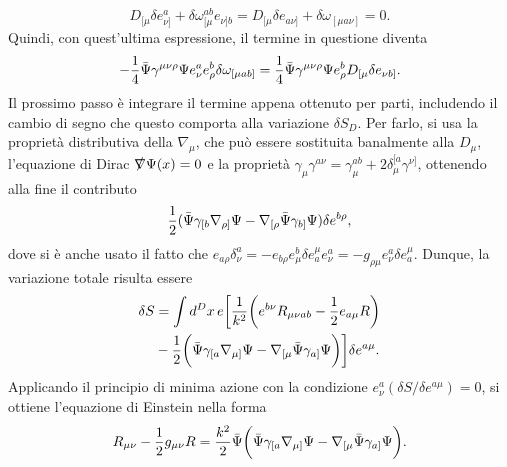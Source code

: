 \begin{equation}
    D_{[\mu}\delta e^a_{\nu]} + \delta\omega^{ab}_{[\mu}e_{\nu]b} = D_{[\mu}\delta e_{a\nu]} + \delta\omega_{[\mu a\nu]} = 0.
\end{equation}
Quindi, con quest'ultima espressione, il termine in questione diventa 
\begin{equation}
    -\frac{1}{4}\b{\Psi}\gamma^{\mu\nu\rho}\Psi e^a_\nu e^b_\rho\delta\omega_{[\mu ab]} = \frac{1}{4}\b{\Psi}\gamma^{\mu\nu\rho}\Psi e^b_\rho D_{[\mu} \delta e_{\nu b]}.
\end{equation}
Il prossimo passo è integrare il termine appena ottenuto per parti, includendo il cambio di segno che questo comporta alla variazione $\delta S_D$. Per farlo, si usa la proprietà distributiva della $\nabla_\mu$, che può essere sostituita banalmente alla $D_\mu$, l'equazione di Dirac $\sl{\nabla}\Psi(x) = 0$ e la proprietà $\gamma_\mu \gamma^{a\nu} = \gamma^{ab}_\mu + 2\delta_\mu^{[a}\gamma^{\nu]}$, ottenendo alla fine il contributo 
\begin{equation}
    \frac{1}{2}(\b{\Psi}\gamma_{[b}\nabla_{\rho]}\Psi - \nabla_{[\rho}\b{\Psi}\gamma_{b]}\Psi)\delta e^{b\rho},
\end{equation}
dove si è anche usato il fatto che $e_{a\rho}\delta^a_\nu = -e_{b\rho}e^b_\mu\delta e^\mu_a e^a_\nu = -g_{\rho\mu}e^a_\nu\delta e^\mu_a$. Dunque, la variazione totale risulta essere 
\begin{equation}
    \begin{split}
        \delta S &= \int d^Dx\,e\bigg[\frac{1}{k^2}\bigg(e^{b\nu}R_{\mu\nu ab} - \frac{1}{2}e_{a\mu}R\bigg) \\
        &- \frac{1}{2}\bigg(\b{\Psi}\gamma_{[a}\nabla_{\mu]}\Psi - \nabla_{[\mu}\b{\Psi}\gamma_{a]}\Psi\bigg)\bigg]\delta e^{a\mu}.
    \end{split}
\end{equation}
Applicando il principio di minima azione con la condizione $e^a_\nu(\delta S/\delta e^{a\mu}) = 0$, si ottiene l'equazione di Einstein nella forma 
\begin{equation}
    R_{\mu\nu} - \frac{1}{2}g_{\mu\nu}R = \frac{k^2}{2}\b{\Psi}\bigg(\b{\Psi}\gamma_{[a}\nabla_{\mu]}\Psi - \nabla_{[\mu}\b{\Psi}\gamma_{a]}\Psi\bigg).
\end{equation}

